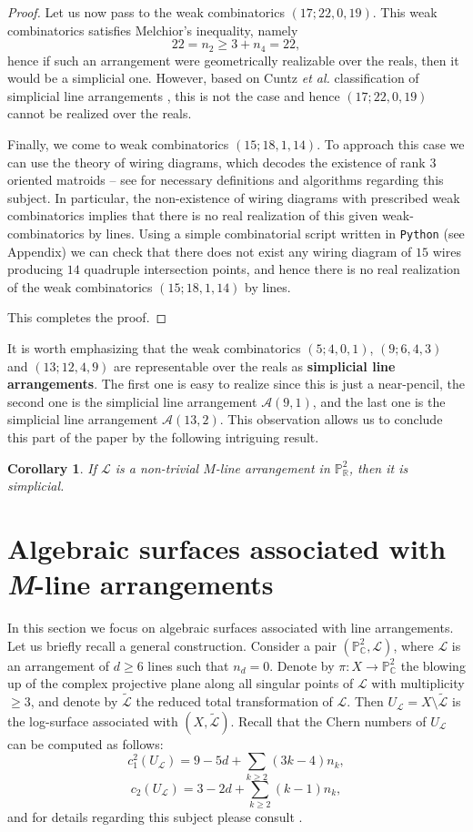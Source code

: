 \documentclass[12pt]{article}
\theoremstyle{plain}
\newtheorem{corollary}[thm]{Corollary}
\theoremstyle{definition}
\begin{document}
\begin{proof}
Let us now pass to the weak combinatorics $(17;22,0,19)$. This weak combinatorics satisfies Melchior's inequality, namely
$$22 = n_{2} \geq 3 + n_{4} = 22,$$
hence if such an arrangement were geometrically realizable over the reals, then it would be a simplicial one. However, based on Cuntz \textit{et al.} classification of simplicial line arrangements \cite{Cuntz}, this is not the case and hence $(17;22,0,19)$ cannot be realized over the reals.

Finally, we come to weak combinatorics $(15;18,1,14)$. To approach this case we can use the theory of wiring diagrams, which decodes the existence of rank $3$ oriented matroids -- see \cite{CuntzS} for necessary definitions and algorithms regarding this subject. In particular, the non-existence of wiring diagrams with prescribed weak combinatorics implies that there is no real realization of this given weak-combinatorics by lines. Using a simple combinatorial script written in \verb}Python} (see Appendix) we can check that there does not exist any wiring diagram of $15$ wires producing $14$ quadruple intersection points, and hence there is no real realization of the weak combinatorics $(15;18,1,14)$ by lines.

This completes the proof.
\end{proof}
It is worth emphasizing that the weak combinatorics $(5;4,0,1)$, $(9;6,4,3)$ and $(13;12,4,9)$ are representable over the reals as \textbf{simplicial line arrangements}. The first one is easy to realize since this is just a near-pencil, the second one is the simplicial line arrangement $\mathcal{A}(9,1)$, and the last one is the simplicial line arrangement $\mathcal{A}(13,2)$. This observation allows us to conclude this part of the paper by the following intriguing result.
\begin{corollary}
If $\mathcal{L}$ is a non-trivial $M$-line arrangement in $\mathbb{P}^{2}_{\mathbb{R}}$, then it is simplicial.
\end{corollary}

\section{Algebraic surfaces associated with \textit{M}-line arrangements}
In this section we focus on algebraic surfaces associated with line arrangements. Let us briefly recall a general construction. Consider a pair $(\mathbb{P}^{2}_{\mathbb{C}},\mathcal{L})$, where $\mathcal{L}$ is an arrangement of $d\geq 6$ lines such that $n_{d}=0$. Denote by $\pi : X \rightarrow \mathbb{P}^{2}_{\mathbb{C}}$ the blowing up of the complex projective plane along all singular points of $\mathcal{L}$ with multiplicity $\geq 3$, and denote by $\widetilde{\mathcal{L}}$ the reduced total transformation of $\mathcal{L}$. Then $U_{\mathcal{L}} = X \setminus \widetilde{\mathcal{L}}$ is the log-surface associated with $(X, \widetilde{\mathcal{L}})$. Recall that the Chern numbers of $U_{\mathcal{L}}$ can be computed as follows:
\[c_{1}^{2}(U_{\mathcal{L}}) = 9 - 5d + \sum_{k\geq 2}(3k-4)n_{k},\]
\[c_{2}(U_{\mathcal{L}}) = 3 - 2d + \sum_{k\geq 2}(k-1)n_{k},\]
and for details regarding this subject please consult \cite[page 9]{BP}. 
\end{document}
